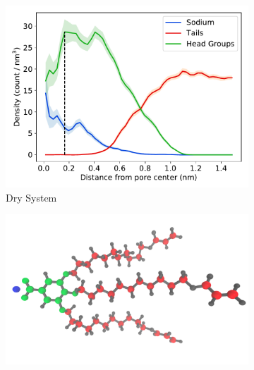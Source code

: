 \documentclass[journal=jpcbfk,manuscript=article]{achemso}
\begin{document}
  \begin{figure}[!htb]
  \centering
  \begin{subfigure}{0.45\textwidth}
  \includegraphics[width=\textwidth]{component_density_dry.pdf}  %
  \caption{Dry System}\label{fig:component_density_dry}
  \end{subfigure}
  \begin{subfigure}{0.45\textwidth}
  \vspace{-0.5cm}
  \includegraphics[width=\textwidth]{monomer_color_coded.pdf}
  \label{fig:monomer_color_coded}
  \end{subfigure}
  \begin{subfigure}{0.45\textwidth}

\end{subfigure}
\end{figure}
\end{document}
